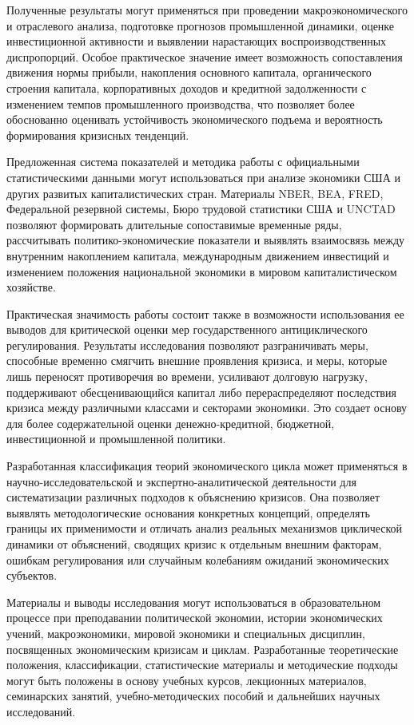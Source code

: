 Полученные результаты могут применяться при проведении макроэкономического и отраслевого анализа, подготовке прогнозов промышленной динамики, оценке инвестиционной активности и выявлении нарастающих воспроизводственных диспропорций. Особое практическое значение имеет возможность сопоставления движения нормы прибыли, накопления основного капитала, органического строения капитала, корпоративных доходов и кредитной задолженности с изменением темпов промышленного производства, что позволяет более обоснованно оценивать устойчивость экономического подъема и вероятность формирования кризисных тенденций.

Предложенная система показателей и методика работы с официальными статистическими данными могут использоваться при анализе экономики США и других развитых капиталистических стран. Материалы NBER, BEA, FRED, Федеральной резервной системы, Бюро трудовой статистики США и UNCTAD позволяют формировать длительные сопоставимые временные ряды, рассчитывать политико-экономические показатели и выявлять взаимосвязь между внутренним накоплением капитала, международным движением инвестиций и изменением положения национальной экономики в мировом капиталистическом хозяйстве.

Практическая значимость работы состоит также в возможности использования ее выводов для критической оценки мер государственного антициклического регулирования. Результаты исследования позволяют разграничивать меры, способные временно смягчить внешние проявления кризиса, и меры, которые лишь переносят противоречия во времени, усиливают долговую нагрузку, поддерживают обесценивающийся капитал либо перераспределяют последствия кризиса между различными классами и секторами экономики. Это создает основу для более содержательной оценки денежно-кредитной, бюджетной, инвестиционной и промышленной политики.

Разработанная классификация теорий экономического цикла может применяться в научно-исследовательской и экспертно-аналитической деятельности для систематизации различных подходов к объяснению кризисов. Она позволяет выявлять методологические основания конкретных концепций, определять границы их применимости и отличать анализ реальных механизмов циклической динамики от объяснений, сводящих кризис к отдельным внешним факторам, ошибкам регулирования или случайным колебаниям ожиданий экономических субъектов.

Материалы и выводы исследования могут использоваться в образовательном процессе при преподавании политической экономии, истории экономических учений, макроэкономики, мировой экономики и специальных дисциплин, посвященных экономическим кризисам и циклам. Разработанные теоретические положения, классификации, статистические материалы и методические подходы могут быть положены в основу учебных курсов, лекционных материалов, семинарских занятий, учебно-методических пособий и дальнейших научных исследований.

